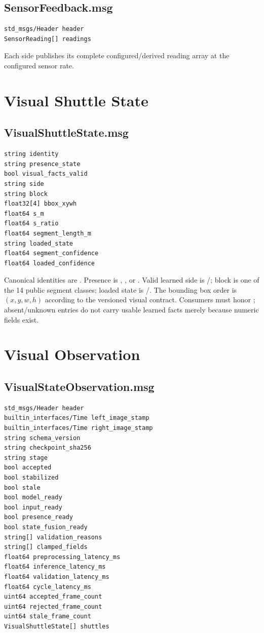 \subsection{SensorFeedback.msg}

\begin{lstlisting}
std_msgs/Header header
SensorReading[] readings
\end{lstlisting}

Each side publishes its complete configured/derived reading array at the
configured sensor rate.

\section{Visual Shuttle State}

\subsection{VisualShuttleState.msg}

\begin{lstlisting}
string identity
string presence_state
bool visual_facts_valid
string side
string block
float32[4] bbox_xywh
float64 s_m
float64 s_ratio
float64 segment_length_m
string loaded_state
float64 segment_confidence
float64 loaded_confidence
\end{lstlisting}

Canonical identities are . Presence is
, , or . Valid learned side is
/; block is one of the 14 public segment classes;
loaded state is /. The bounding box order is
$(x,y,w,h)$ according to the versioned visual contract. Consumers must honor
; absent/unknown entries do not carry usable learned
facts merely because numeric fields exist.

\section{Visual Observation}

\subsection{VisualStateObservation.msg}

\begin{lstlisting}
std_msgs/Header header
builtin_interfaces/Time left_image_stamp
builtin_interfaces/Time right_image_stamp
string schema_version
string checkpoint_sha256
string stage
bool accepted
bool stabilized
bool stale
bool model_ready
bool input_ready
bool presence_ready
bool state_fusion_ready
string[] validation_reasons
string[] clamped_fields
float64 preprocessing_latency_ms
float64 inference_latency_ms
float64 validation_latency_ms
float64 cycle_latency_ms
uint64 accepted_frame_count
uint64 rejected_frame_count
uint64 stale_frame_count
VisualShuttleState[] shuttles
\end{lstlisting}

